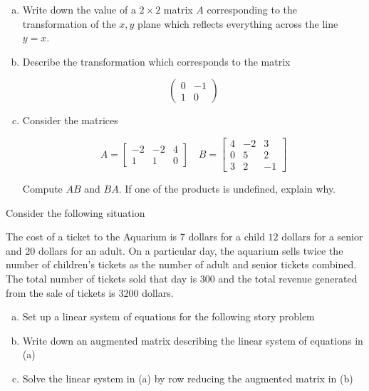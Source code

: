 \documentclass[11pt]{exam}
\theoremstyle{definition}
\begin{document}
\begin{questions}
\newpage
\question[10]\mbox{}

\begin{enumerate}[(a)]
\item Write down the value of a $2\times 2$ matrix $A$ corresponding to the transformation of the $x,y$ plane which reflects everything across the line $y=x$.
\vspace{2in}
\item Describe the transformation which corresponds to the matrix

$$\left(\begin{array}{cc}
 0 & -1\\
 1 &  0
\end{array}\right)$$
\vspace{3in}

\item Consider the matrices

$$A = \left[\begin{array}{ccc} -2 & -2 & 4\\ 1 & 1 & 0\end{array}\right]
\quad
B = \left[\begin{array}{ccc} 4 & -2 & 3\\ 0 & 5 & 2\\ 3 & 2 & -1\end{array}\right]$$

Compute $AB$ and $BA$.  If one of the products is undefined, explain why.
\end{enumerate}

\newpage
\question[10]\mbox{}

Consider the following situation

The cost of a ticket to the Aquarium is $7$ dollars for a child $12$ dollars for a senior and $20$ dollars for an adult.
On a particular day, the aquarium sells twice the number of children's tickets as the number of adult and senior tickets combined.
The total number of tickets sold that day is $300$ and the total revenue generated from the sale of tickets is $3200$ dollars.

\begin{enumerate}[(a)]
\item Set up a linear system of equations for the following story problem
\vspace{2in}
\item Write down an augmented matrix describing the linear system of equations in (a)
\vspace{1.5in}
\item Solve the linear system in (a) by row reducing the augmented matrix in (b)
\end{enumerate}


\end{questions}
\end{document}
